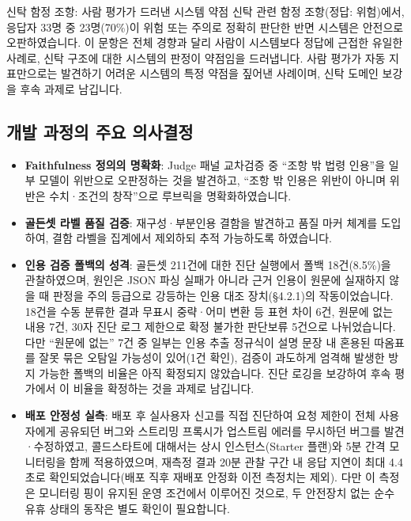 \documentclass[10pt,a4paper]{article}
\begin{document}
\begin{obsbox}{신탁 함정 조항: 사람 평가가 드러낸 시스템 약점}
신탁 관련 함정 조항(정답: 위험)에서, 응답자 33명 중 23명(70\%)이 위험 또는 주의로 정확히 판단한 반면 시스템은 안전으로 오판하였습니다. 이 문항은 전체 경향과 달리 사람이 시스템보다 정답에 근접한 유일한 사례로, 신탁 구조에 대한 시스템의 판정이 약점임을 드러냅니다. 사람 평가가 자동 지표만으로는 발견하기 어려운 시스템의 특정 약점을 짚어낸 사례이며, 신탁 도메인 보강을 후속 과제로 남깁니다.
\end{obsbox}

\subsection{개발 과정의 주요 의사결정}
\begin{itemize}
\item \textbf{Faithfulness 정의의 명확화}: Judge 패널 교차검증 중 ``조항 밖 법령 인용''을 일부 모델이 위반으로 오판정하는 것을 발견하고, ``조항 밖 인용은 위반이 아니며 위반은 수치·조건의 창작''으로 루브릭을 명확화하였습니다.
\item \textbf{골든셋 라벨 품질 검증}: 재구성·부분인용 결함을 발견하고 품질 마커 체계를 도입하여, 결함 라벨을 집계에서 제외하되 추적 가능하도록 하였습니다.
\item \textbf{인용 검증 폴백의 성격}: 골든셋 211건에 대한 진단 실행에서 폴백 18건(8.5\%)을 관찰하였으며, 원인은 JSON 파싱 실패가 아니라 근거 인용이 원문에 실재하지 않을 때 판정을 주의 등급으로 강등하는 인용 대조 장치(\S4.2.1)의 작동이었습니다. 18건을 수동 분류한 결과 무표시 중략·어미 변환 등 표현 차이 6건, 원문에 없는 내용 7건, 30자 진단 로그 제한으로 확정 불가한 판단보류 5건으로 나뉘었습니다. 다만 ``원문에 없는'' 7건 중 일부는 인용 추출 정규식이 설명 문장 내 혼용된 따옴표를 잘못 묶은 오탐일 가능성이 있어(1건 확인), 검증이 과도하게 엄격해 발생한 방지 가능한 폴백의 비율은 아직 확정되지 않았습니다. 진단 로깅을 보강하여 후속 평가에서 이 비율을 확정하는 것을 과제로 남깁니다.
\item \textbf{배포 안정성 실측}: 배포 후 실사용자 신고를 직접 진단하여 요청 제한이 전체 사용자에게 공유되던 버그와 스트리밍 프록시가 업스트림 에러를 무시하던 버그를 발견·수정하였고, 콜드스타트에 대해서는 상시 인스턴스(Starter 플랜)와 5분 간격 모니터링을 함께 적용하였으며, 재측정 결과 20분 관찰 구간 내 응답 지연이 최대 4.4초로 확인되었습니다(배포 직후 재배포 안정화 이전 측정치는 제외). 다만 이 측정은 모니터링 핑이 유지된 운영 조건에서 이루어진 것으로, 두 안전장치 없는 순수 유휴 상태의 동작은 별도 확인이 필요합니다.
\end{itemize}
\end{document}
